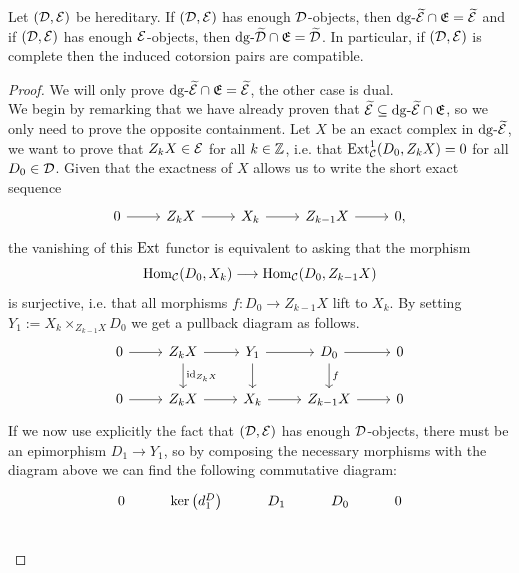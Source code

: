 \begin{theorem}
    \label{thm:induced-compatible}
    Let $(\mathcal{D}, \mathcal{E})$ be hereditary. If $(\mathcal{D}, \mathcal{E})$ has enough $\mathcal{D}$-objects, then $\mathrm{dg} \text{-}\widetilde{\mathcal{E}} \cap \mathfrak{E} = \widetilde{\mathcal{E}}$ and if $(\mathcal{D}, \mathcal{E})$ has enough $\mathcal{E}$-objects, then $\mathrm{dg} \text{-}\widetilde{\mathcal{D}} \cap \mathfrak{E} = \widetilde{\mathcal{D}}$. In particular, if $(\mathcal{D}, \mathcal{E})$ is complete then the induced cotorsion pairs are compatible.
\end{theorem}

\begin{proof}
    We will only prove $\mathrm{dg} \text{-}\widetilde{\mathcal{E}} \cap \mathfrak{E} = \widetilde{\mathcal{E}}$, the other case is dual. \\
    We begin by remarking that we have already proven that $\widetilde{\mathcal{E}} \subseteq \mathrm{dg} \text{-}\widetilde{\mathcal{E}} \cap \mathfrak{E}$, so we only need to prove the opposite containment. Let $X$ be an exact complex in $\mathrm{dg} \text{-}\widetilde{\mathcal{E}}$, we want to prove that $Z_k X \in \mathcal{E}$ for all $k \in \mathbb{Z}$, i.e. that $\mathrm{Ext}^1_{\mathcal{C}}(D_0, Z_k X)=0$ for all $D_0 \in \mathcal{D}$. Given that the exactness of $X$ allows us to write the short exact sequence 
    \[\begin{tikzcd}
        0 & {Z_{k}X} & {X_k} & {Z_{k-1}X} & {0,}
        \arrow[from=1-1, to=1-2]
        \arrow[from=1-2, to=1-3]
        \arrow[from=1-3, to=1-4]
        \arrow[from=1-4, to=1-5]
    \end{tikzcd}\]
    the vanishing of this $\mathrm{Ext}$ functor is equivalent to asking that the morphism
    \[\mathrm{Hom}_{\mathcal{C}}(D_0, X_k)\longrightarrow \mathrm{Hom}_{\mathcal{C}}(D_0, Z_{k-1} X)\]
    is surjective, i.e. that all morphisms $f\colon D_0 \longrightarrow Z_{k-1} X$ lift to $X_k$. 
    By setting $Y_1 := X_k \times_{Z_{k-1}X} D_0$ we get a pullback diagram as follows.
    \[\begin{tikzcd}
        0 & {Z_kX} & {Y_1} & {D_0} & 0 \\
        0 & {Z_{k}X} & {X_k} & {Z_{k-1}X} & {0}
        \arrow[from=1-1, to=1-2]
        \arrow[from=1-2, to=1-3]
        \arrow["{\id_{Z_kX}}", from=1-2, to=2-2]
        \arrow[from=1-3, to=1-4]
        \arrow[from=1-3, to=2-3]
        \arrow[from=1-4, to=1-5]
        \arrow["f", from=1-4, to=2-4]
        \arrow[from=2-1, to=2-2]
        \arrow[from=2-2, to=2-3]
        \arrow[from=2-3, to=2-4]
        \arrow[from=2-4, to=2-5]
    \end{tikzcd}\]
    If we now use explicitly the fact that $(\mathcal{D}, \mathcal{E})$ has enough $\mathcal{D}$-objects, there must be an epimorphism $D_1 \longrightarrow Y_1$, so by composing the necessary morphisms with the diagram above we can find the following commutative diagram:
    \[\begin{tikzcd}
        0 & {\ker\left(d^D_{1}\right)} & {D_1} & {D_0} & 0 \\

\end{tikzcd}\]
\end{proof}
